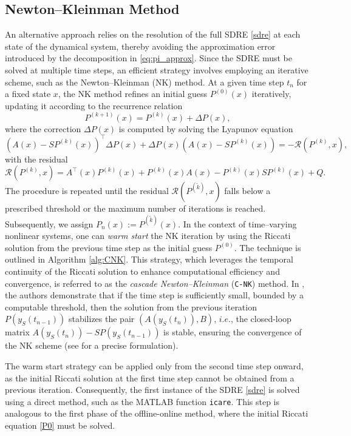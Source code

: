 \documentclass{article}
\newcommand{\first}[1]{{\color{black}{#1}}}
\begin{document}
\subsection{Newton–Kleinman Method}
An alternative approach relies on the resolution of the full SDRE \eqref{sdre} at each state of the dynamical system, thereby avoiding the approximation error introduced by the decomposition in \eqref{eq:pi_approx}. Since the SDRE must be solved at multiple time steps, an efficient strategy involves employing an iterative scheme, such as the Newton–Kleinman (NK) method.  At a given time step $t_n$ for a fixed state $x$, the NK method refines an initial guess \(P^{(0)}(x)\) iteratively, updating it according to the recurrence relation
\begin{equation}
  P^{(k+1)}(x) = P^{(k)}(x) + \Delta P(x),
  \label{eq:NK_update}
\end{equation}
where the correction \(\Delta P(x)\) is computed by solving the Lyapunov equation
\begin{equation}
  (A(x)-SP^{(k)}(x) )^\top \Delta P(x) + \Delta P(x) (A(x)-SP^{(k)}(x) )  = -\mathcal{R}(P^{(k)},x),
  \label{eq:NK_lyap}
\end{equation}
with the residual
\[
\mathcal{R}(P^{(k)},x) = A^\top(x) P^{(k)}(x) + P^{(k)}(x) A(x) - P^{(k)}(x) S P^{(k)}(x) + Q.
\]
The procedure is repeated until the residual $\mathcal{R}(P^{(\tilde{k})},x)$ falls below a prescribed threshold or the maximum number of iterations is reached. Subsequently, we assign $P_{n}(x):=P^{(\tilde{k})}(x)$.
In the context of time–varying nonlinear systems, one can \emph{warm start} the NK iteration by using the Riccati solution from the previous time step as the initial guess \(P^{(0)}\). The technique is outlined in Algorithm \ref{alg:CNK}.
This strategy, which leverages the temporal continuity of the Riccati solution to enhance computational efficiency and convergence, is referred to as the \emph{cascade Newton–Kleinman} (\texttt{C-NK}) method. In \cite{saluzzi2025dynamical}, the authors demonstrate that if the time step is sufficiently small, bounded by a computable threshold, then the solution from the previous iteration $P(y_S(t_{n-1}))$ stabilizes the pair $(A(y_S(t_n)),B)$, $i.e.$, the closed-loop matrix $A(y_S(t_n))-S P(y_S(t_{n-1}))$ is stable, ensuring the convergence of the NK scheme (see \cite{kleinman1968} for a precise formulation).

The warm start strategy can be applied only from the second time step onward, as the initial Riccati solution at the first time step cannot be obtained from a previous iteration. Consequently, the first instance of the SDRE \eqref{sdre} is solved using a direct method, such as the MATLAB function \texttt{icare}. This step is analogous to the first phase of the offline-online method, where the initial Riccati equation \eqref{P0} must be solved. \first{The method does not require the input matrix $B$ to be constant; it can be applied as well when $B$ is state dependent, namely $B = B(x)$.
}
\end{document}
